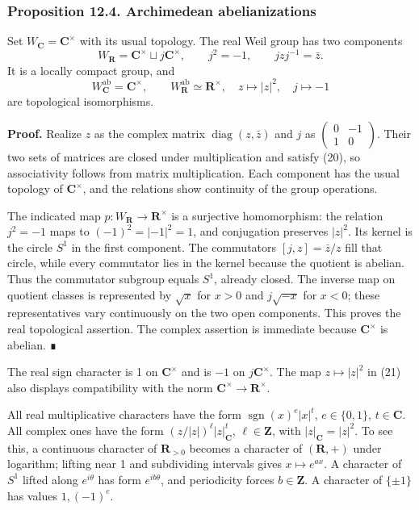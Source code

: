 \documentclass[11pt,a4paper]{article}
\begin{document}
\subsubsection{Proposition 12.4. Archimedean
abelianizations}\label{proposition-12.4.-archimedean-abelianizations}

Set \(W_{\mathbf C}=\mathbf C^\times\) with its usual topology. The real
Weil group has two components \[
W_{\mathbf R}=\mathbf C^\times\sqcup j\mathbf C^\times,\qquad
j^2=-1,\qquad jzj^{-1}=\bar z.
\tag{20}
\] It is a locally compact group, and \[
W_{\mathbf C}^{\mathrm{ab}}=\mathbf C^\times,\qquad
W_{\mathbf R}^{\mathrm{ab}}\simeq\mathbf R^\times,
\quad z\longmapsto|z|^2,\quad j\longmapsto-1
\tag{21}
\] are topological isomorphisms.

\textbf{Proof.} Realize \(z\) as the complex matrix
\(\operatorname{diag}(z,\bar z)\) and \(j\) as
\(\left(\begin{smallmatrix}0&-1\\1&0\end{smallmatrix}\right)\). Their
two sets of matrices are closed under multiplication and satisfy (20),
so associativity follows from matrix multiplication. Each component has
the usual topology of \(\mathbf C^\times\), and the relations show
continuity of the group operations.

The indicated map \(p:W_{\mathbf R}\to\mathbf R^\times\) is a surjective
homomorphism: the relation \(j^2=-1\) maps to \((-1)^2=|-1|^2=1\), and
conjugation preserves \(|z|^2\). Its kernel is the circle \(S^1\) in the
first component. The commutators \([j,z]=\bar z/z\) fill that circle,
while every commutator lies in the kernel because the quotient is
abelian. Thus the commutator subgroup equals \(S^1\), already closed.
The inverse map on quotient classes is represented by \(\sqrt{x}\) for
\(x>0\) and \(j\sqrt{-x}\) for \(x<0\); these representatives vary
continuously on the two open components. This proves the real
topological assertion. The complex assertion is immediate because
\(\mathbf C^\times\) is abelian. ∎

The real sign character is 1 on \(\mathbf C^\times\) and is \(-1\) on
\(j\mathbf C^\times\). The map \(z\mapsto|z|^2\) in (21) also displays
compatibility with the norm \(\mathbf C^\times\to\mathbf R^\times\).

All real multiplicative characters have the form
\(\operatorname{sgn}(x)^e|x|^t\), \(e\in\{0,1\}\), \(t\in\mathbf C\).
All complex ones have the form \((z/|z|)^\ell|z|_{\mathbf C}^t\),
\(\ell\in\mathbf Z\), with \(|z|_{\mathbf C}=|z|^2\). To see this, a
continuous character of \(\mathbf R_{>0}\) becomes a character of
\((\mathbf R,+)\) under logarithm; lifting near 1 and subdividing
intervals gives \(x\mapsto e^{ax}\). A character of \(S^1\) lifted along
\(e^{i\theta}\) has form \(e^{ib\theta}\), and periodicity forces
\(b\in\mathbf Z\). A character of \(\{\pm1\}\) has values \(1,(-1)^e\).
\end{document}

